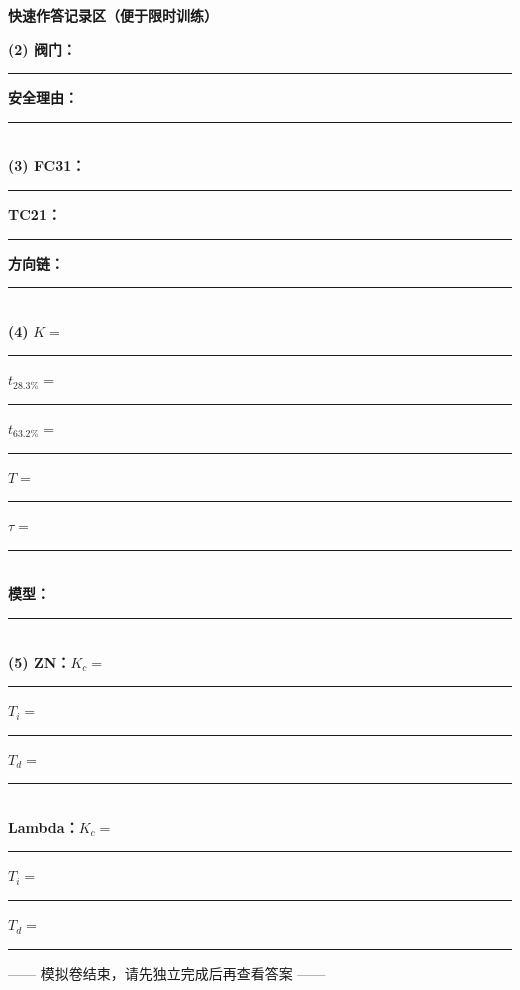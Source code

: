 \documentclass[UTF8,a4paper,11pt]{ctexart}
\begin{document}
\vspace{2mm}
\noindent\colorbox{soft}{\parbox{0.94\linewidth}{\textbf{快速作答记录区（便于限时训练）}}}
\vspace{2mm}

\noindent\textbf{(2) 阀门：}\rule{35mm}{0.4pt}\quad \textbf{安全理由：}\rule{80mm}{0.4pt}\\[5mm]
\noindent\textbf{(3) FC31：}\rule{28mm}{0.4pt}\quad \textbf{TC21：}\rule{28mm}{0.4pt}\quad \textbf{方向链：}\rule{55mm}{0.4pt}\\[5mm]
\noindent\textbf{(4) }$K=$\rule{18mm}{0.4pt}\quad $t_{28.3\%}=$\rule{18mm}{0.4pt}\quad $t_{63.2\%}=$\rule{18mm}{0.4pt}\quad $T=$\rule{18mm}{0.4pt}\quad $\tau=$\rule{18mm}{0.4pt}\\[5mm]
\noindent\textbf{模型：}\rule{125mm}{0.4pt}\\[6mm]
\noindent\textbf{(5) ZN：}\quad $K_c=$\rule{18mm}{0.4pt}\quad $T_i=$\rule{18mm}{0.4pt}\quad $T_d=$\rule{18mm}{0.4pt}\\[5mm]
\noindent\textbf{Lambda：}\quad $K_c=$\rule{18mm}{0.4pt}\quad $T_i=$\rule{18mm}{0.4pt}\quad $T_d=$\rule{18mm}{0.4pt}

\vfill
\begin{center}
\color{gray}\small —— 模拟卷结束，请先独立完成后再查看答案 ——
\end{center}
\end{document}
